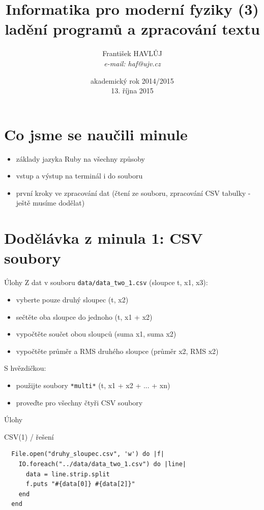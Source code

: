 \documentclass{beamer}
\title[IMF (3)]{Informatika pro moderní fyziky (3)\\ladění programů a zpracování textu}
\author[Franti\v{s}ek HAVL\r{U}J, ORF ÚJV Řež]{Franti\v{s}ek HAVL\r{U}J\\{\scriptsize \emph{e-mail: haf@ujv.cz}}}
\date{akademický rok 2014/2015\\13. října 2015}
\institute[ORF ÚJV Řež]
{ÚJV Řež\\oddělení Reaktorové fyziky a podpory palivového cyklu}
\begin{document}
\begin{frame}
  \titlepage
\end{frame}

\begin{frame}
  \tableofcontents
\end{frame}

\section{Co jsme se naučili minule}

\begin{frame}{}
  \begin{itemize}
    \item základy jazyka Ruby na všechny způsoby
    \item vstup a výstup na terminál i do souboru
    \item první kroky ve zpracování dat (čtení ze souboru, zpracování CSV tabulky - ještě musíme dodělat)
  \end{itemize}
\end{frame}

\section{Dodělávka z minula 1: CSV soubory}

\begin{frame}{Úlohy}
  Z dat v souboru \texttt{data/data\_two\_1.csv} (sloupce t, x1, x3):
  \begin{itemize}
    \item vyberte pouze druhý sloupec (t, x2)
    \item sečtěte oba sloupce do jednoho (t, x1 + x2)
    \item vypočtěte součet obou sloupců (suma x1, suma x2)
    \item vypočtěte průměr a RMS druhého sloupce (průměr x2, RMS x2)
  \end{itemize}
  S hvězdičkou:
  \begin{itemize}
    \item použijte soubory \texttt{*multi*} (t, x1 + x2 + ... + xn)
    \item proveďte pro všechny čtyři CSV soubory
  \end{itemize}
\end{frame}

\begin{frame}[fragile]{Úlohy}
  \begin{block}{CSV(1) / řešení}
    \scriptsize
\begin{verbatim}
  File.open("druhy_sloupec.csv", 'w') do |f|
    IO.foreach("../data/data_two_1.csv") do |line|
      data = line.strip.split
      f.puts "#{data[0]} #{data[2]}"
    end
  end
\end{verbatim}
  \end{block}
\end{frame}
\end{document}
